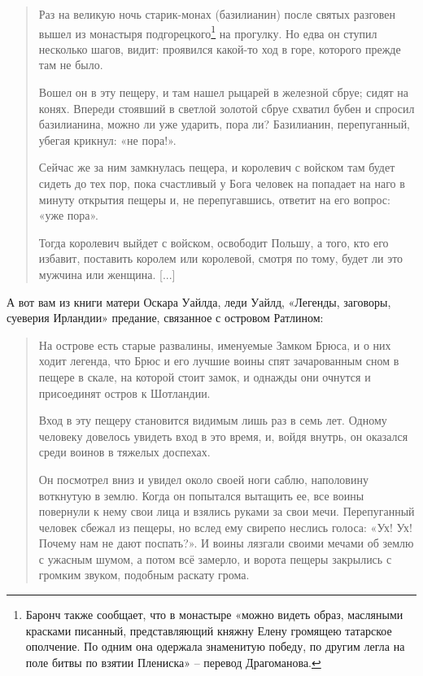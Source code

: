 \begin{quotation}
Раз на великую ночь старик-монах (базилианин) после святых разговен вышел из монастыря подгорецкого\footnote{Баронч также сообщает, что в монастыре «можно видеть образ, масляными красками писанный, представляющий княжну Елену громящею татарское ополчение. По одним она одержала знаменитую победу, по другим легла на поле битвы по взятии Плениска» – перевод Драгоманова.} на прогулку. Но едва он ступил несколько шагов, видит: проявился какой-то ход в горе, которого прежде там не было.

Вошел он в эту пещеру, и там нашел рыцарей в железной сбруе; сидят на конях. Впереди стоявший в светлой золотой сбруе схватил бубен и спросил базилианина, можно ли уже ударить, пора ли? Базилианин, перепуганный, убегая крикнул: «не пора!». 

Сейчас же за ним замкнулась пещера, и королевич с войском там будет сидеть до тех пор, пока счастливый у Бога человек на попадает на наго в минуту открытия пещеры и, не перепугавшись, ответит на его вопрос: «уже пора».

Тогда королевич выйдет с войском, освободит Польшу, а того, кто его избавит, поставить королем или королевой, смотря по тому, будет ли это мужчина или женщина. [...]
\end{quotation}

А вот вам из книги матери Оскара Уайлда, леди Уайлд, «Легенды, заговоры, суеверия Ирландии»\cite{wilde01} предание, связанное с островом Ратлином:

\begin{quotation}
На острове есть старые развалины, именуемые Замком Брюса, и о них ходит легенда, что Брюс и его лучшие воины спят зачарованным сном в пещере в скале, на которой стоит замок, и однажды они очнутся и присоединят остров к Шотландии.

Вход в эту пещеру становится видимым лишь раз в семь лет. Одному человеку довелось увидеть вход в это время, и, войдя внутрь, он оказался среди воинов в тяжелых доспехах. 

Он посмотрел вниз и увидел около своей ноги саблю, наполовину воткнутую в землю. Когда он попытался вытащить ее, все воины повернули к нему свои лица и взялись руками за свои мечи. Перепуганный человек сбежал из пещеры, но вслед ему свирепо неслись голоса: «Ух! Ух! Почему нам не дают поспать?». И воины лязгали своими мечами об землю с ужасным шумом, а потом всё замерло, и ворота пещеры закрылись с громким звуком, подобным раскату грома.
\end{quotation}

